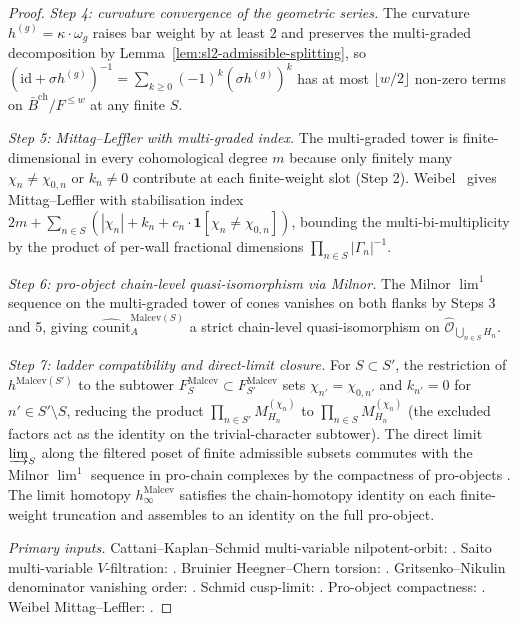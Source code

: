 \begin{proof}
\emph{Step 4: curvature convergence of the geometric series.} The
curvature $h^{(g)}=\kappa\cdot\omega_g$ raises bar weight by at least
$2$ and preserves the multi-graded decomposition by
Lemma~\textup{\ref{lem:sl2-admissible-splitting}}, so
$(\mathrm{id}+\sigma h^{(g)})^{-1}=\sum_{k\geq 0}(-1)^k(\sigma h^{(g)})^k$
has at most $\lfloor w/2\rfloor$ non-zero terms on
$\bar B^{\mathrm{ch}}/F^{\leq w}$ at any finite $S$.

\emph{Step 5: Mittag--Leffler with multi-graded index.} The multi-graded
tower is finite-dimensional in every cohomological degree $m$ because
only finitely many $\chi_n\neq\chi_{0,n}$ or $k_n\neq 0$ contribute at
each finite-weight slot (Step 2). Weibel~\cite[Prop.~3.5.7]{Weibel94}
gives Mittag--Leffler with stabilisation index
$2m+\sum_{n\in S}(|\chi_n|+k_n+c_n\cdot\mathbf 1[\chi_n\neq\chi_{0,n}])$,
bounding the multi-bi-multiplicity by the product of per-wall
fractional dimensions $\prod_{n\in S}|\Gamma_n|^{-1}$.

\emph{Step 6: pro-object chain-level quasi-isomorphism via Milnor.}
The Milnor $\lim^1$ sequence on the multi-graded tower of cones
vanishes on both flanks by Steps 3 and 5, giving
$\widehat{\mathrm{counit}}^{\mathrm{Malcev}(S)}_A$ a strict chain-level
quasi-isomorphism on
$\widehat{\mathcal{O}}_{\bigcup_{n\in S}H_n}$.

\emph{Step 7: ladder compatibility and direct-limit closure.} For
$S\subset S'$, the restriction of
$h^{\mathrm{Malcev}(S')}$ to the subtower
$F_S^{\mathrm{Malcev}}\subset F_{S'}^{\mathrm{Malcev}}$ sets
$\chi_{n'}=\chi_{0,n'}$ and $k_{n'}=0$ for $n'\in S'\setminus S$,
reducing the product $\prod_{n\in S'}M^{(\chi_n)}_{H_n}$ to
$\prod_{n\in S}M^{(\chi_n)}_{H_n}$ (the excluded factors act as the
identity on the trivial-character subtower). The direct limit
$\varinjlim_S$ along the filtered poset of finite admissible subsets
commutes with the Milnor $\lim^1$ sequence in pro-chain complexes by
the compactness of pro-objects
\cite[\S 5.8]{BeilinsonDrinfeld2004}. The limit homotopy
$h^{\mathrm{Malcev}}_\infty$ satisfies the chain-homotopy identity on
each finite-weight truncation and assembles to an identity on the
full pro-object.

\emph{Primary inputs.} Cattani--Kaplan--Schmid multi-variable
nilpotent-orbit: \cite[Thm.~3.3, \S 3.7]{CattaniKaplanSchmid1986}.
Saito multi-variable $V$-filtration:
\cite[Appendix~A, Thm.~A.3]{SaitoMHM1988}. Bruinier Heegner--Chern
torsion: \cite[Thm.~1.1, Prop.~5.1]{Bruinier2002LNM}.
Gritsenko--Nikulin denominator vanishing order:
\cite[\S 3, Cor.~3.2]{GritsenkoNikulin1998}. Schmid cusp-limit:
\cite[\S 5]{Schmid1973}. Pro-object compactness:
\cite[\S 5.8]{BeilinsonDrinfeld2004}. Weibel Mittag--Leffler:
\cite[Prop.~3.5.7]{Weibel94}.
\end{proof}

